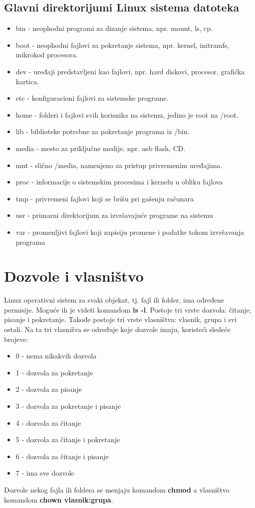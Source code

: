 \documentclass[a4paper,14pt]{article}
\begin{document}
\subsection{Glavni direktorijumi Linux sistema datoteka}
\begin{itemize}
\item bin - neophodni programi za dizanje sistema, npr. mount, ls, cp.
\item boot - neophodni fajlovi za pokretanje sistema, npr. kernel, initramfs, mikrokod procesora.
\item dev - uređaji predstavljeni kao fajlovi, npr. hard diskovi, procesor, grafička kartica.
\item etc - konfiguracioni fajlovi za sistemske programe.
\item home - folderi i fajlovi svih korisnika na sistemu, jedino je root na /root.
\item lib - biblioteke potrebne za pokretanje programa iz /bin.
\item media - mesto za priključne medije, npr. usb flash, CD.
\item mnt - slično /media, namenjeno za pristup privremenim uređajima.
\item proc - informacije o sistemskim procesima i kernelu u obliku fajlova
\item tmp - privremeni fajlovi koji se brišu pri gašenju računara
\item usr - primarni direktorijum za izvršavajuće programe na sistemu
\item var - promenljivi fajlovi koji zapisiju promene i podatke tokom izvršavanja programa
\end{itemize}
\newpage

\section{Dozvole i vlasništvo}
Linux operativni sistem za svaki objekat, tj. fajl ili folder, ima određene permisije. Moguće ih je videti komandom \textbf{ls -l}. Postoje tri vrste dozvola: čitanje, pisanje i pokretanje. Takođe postoje tri vrste vlasništva: vlasnik, grupa i svi ostali. Na ta tri vlasnišva se određuje koje dozvole imaju, koristeći sledeće brojeve:
\begin{itemize}
\item 0 - nema nikakvih dozvola
\item 1 - dozvola za pokretanje
\item 2 - dozvola za pisanje
\item 3 - dozvola za pokretanje i pisanje
\item 4 - dozvola za čitanje
\item 5 - dozvola za čitanje i pokretanje
\item 6 - dozvola za čitanje i pisanje
\item 7 - ima sve dozvole
\end{itemize}
Dozvole nekog fajla ili foldera se menjaju komandom \textbf{chmod} a vlasništvo komandom \textbf{chown vlasnik:grupa}.
\end{document}
